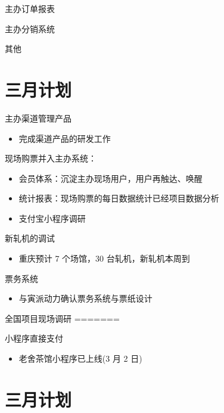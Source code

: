 \documentclass[presentation, bigger]{beamer}
\begin{document}
\begin{frame}[label={sec:orgb81fa7f}]{主办订单报表}
\begin{frame}[label={sec:org37bc7b4}]{主办分销系统}
\begin{frame}[label={sec:org82cc8d4}]{其他}
\section{三月计划}
\label{sec:org9f34445}

\begin{frame}[label={sec:org68a1601}]{主办渠道管理产品}
\begin{itemize}
\item 完成渠道产品的研发工作
\end{itemize}
\end{frame}

\begin{frame}[label={sec:orgeb64bd1}]{现场购票并入主办系统：}
\begin{itemize}
\item 会员体系：沉淀主办现场用户，用户再触达、唤醒
\item 统计报表：现场购票的每日数据统计已经项目数据分析
\item 支付宝小程序调研
\end{itemize}
\end{frame}

\begin{frame}[label={sec:org053fe6c}]{新轧机的调试}
\begin{itemize}
\item 重庆预计 7 个场馆，30 台轧机，新轧机本周到
\end{itemize}
\end{frame}

\begin{frame}[label={sec:org40530be}]{票务系统}
\begin{itemize}
\item 与寅派动力确认票务系统与票纸设计
\end{itemize}
\end{frame}

\begin{frame}[label={sec:org8dbf69c}]{全国项目现场调研}
=======
\end{frame}

\begin{frame}[label={sec:orgf435c4d}]{小程序直接支付}
\begin{itemize}
\item 老舍茶馆小程序已上线(3 月 2 日)
\end{itemize}
\end{frame}


\section{三月计划}
\label{sec:org143ebbb}


\end{frame}
\end{frame}
\end{frame}
\end{document}
